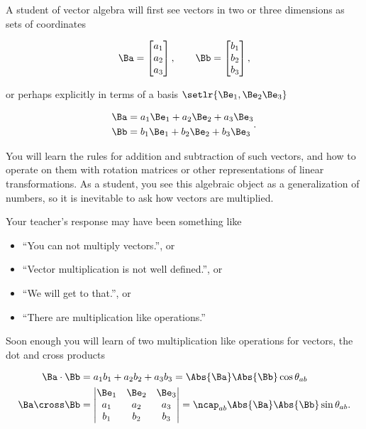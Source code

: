 A student of vector algebra will first see vectors in two or three dimensions as sets of coordinates

\begin{equation}\label{eqn:GAIntroduction:20}
\Ba = 
\begin{bmatrix}
a_1 \\
a_2 \\
a_3 \\
\end{bmatrix}, \qquad
\Bb = 
\begin{bmatrix}
b_1 \\
b_2 \\
b_3 \\
\end{bmatrix},
\end{equation}

or perhaps explicitly in terms of a basis \( \setlr{ \Be_1, \Be_2 \Be_3 } \)

\begin{dmath}\label{eqn:GAIntroduction:40}
\begin{aligned}
\Ba &= a_1 \Be_1 + a_2 \Be_2 + a_3 \Be_3  \\
\Bb &= b_1 \Be_1 + b_2 \Be_2 + b_3 \Be_3
\end{aligned}.
\end{dmath}

You will learn the rules for addition and subtraction of such vectors, and how to operate on them with rotation matrices or other representations of linear transformations.  As a student, you see this algebraic object as a generalization of numbers, so it is inevitable to
ask how vectors are multiplied.

Your teacher's response may have been something like

\begin{itemize}
\item ``You can not multiply vectors.'', or
\item ``Vector multiplication is not well defined.'', or
\item ``We will get to that.'', or
\item ``There are multiplication like operations.''
\end{itemize}

Soon enough you will learn of two multiplication like operations for vectors, the dot and cross products

\begin{dmath}\label{eqn:GAIntroduction:60}
\begin{aligned}
\Ba \cdot \Bb &= a_1 b_1 + a_2 b_2 + a_3 b_3 = \Abs{\Ba} \Abs{\Bb} \cos \theta_{ab} \\
\Ba \cross \Bb &= 
\begin{vmatrix}
\Be_1 & \Be_2 & \Be_3 \\
a_1 & a_2 & a_3 \\
b_1 & b_2 & b_3 \\
\end{vmatrix}
= \ncap_{ab} \Abs{\Ba} \Abs{\Bb} \sin\theta_{ab}.
\end{aligned}
\end{dmath}

